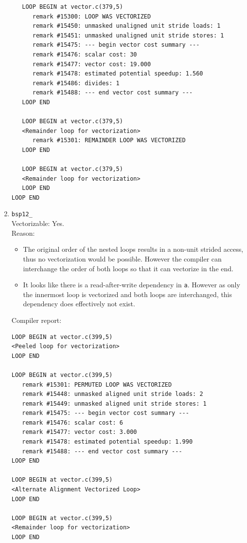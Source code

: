 \documentclass[11pt]{article}
\begin{document}
\begin{enumerate}
\begin{lstlisting}
   LOOP BEGIN at vector.c(379,5)
      remark #15300: LOOP WAS VECTORIZED
      remark #15450: unmasked unaligned unit stride loads: 1 
      remark #15451: unmasked unaligned unit stride stores: 1 
      remark #15475: --- begin vector cost summary ---
      remark #15476: scalar cost: 30 
      remark #15477: vector cost: 19.000 
      remark #15478: estimated potential speedup: 1.560 
      remark #15486: divides: 1 
      remark #15488: --- end vector cost summary ---
   LOOP END

   LOOP BEGIN at vector.c(379,5)
   <Remainder loop for vectorization>
      remark #15301: REMAINDER LOOP WAS VECTORIZED
   LOOP END

   LOOP BEGIN at vector.c(379,5)
   <Remainder loop for vectorization>
   LOOP END
LOOP END
\end{lstlisting}

\item \texttt{bsp12\_}\\
Vectorizable: Yes.\\
Reason:
\begin{itemize}
\item The original order of the nested loops results in a non-unit strided access, thus no vectorization would be possible. However the compiler can interchange the order of both loops so that it can vectorize in the end.
\item It looks like there is a read-after-write dependency in \texttt{a}. However as only the innermost loop is vectorized and both loops are interchanged, this dependency does effectively not exist.
\end{itemize}
Compiler report:
\begin{lstlisting}
LOOP BEGIN at vector.c(399,5)
<Peeled loop for vectorization>
LOOP END

LOOP BEGIN at vector.c(399,5)
   remark #15301: PERMUTED LOOP WAS VECTORIZED
   remark #15448: unmasked aligned unit stride loads: 2 
   remark #15449: unmasked aligned unit stride stores: 1 
   remark #15475: --- begin vector cost summary ---
   remark #15476: scalar cost: 6 
   remark #15477: vector cost: 3.000 
   remark #15478: estimated potential speedup: 1.990 
   remark #15488: --- end vector cost summary ---
LOOP END

LOOP BEGIN at vector.c(399,5)
<Alternate Alignment Vectorized Loop>
LOOP END

LOOP BEGIN at vector.c(399,5)
<Remainder loop for vectorization>
LOOP END
\end{lstlisting}


\end{enumerate}
\end{document}
